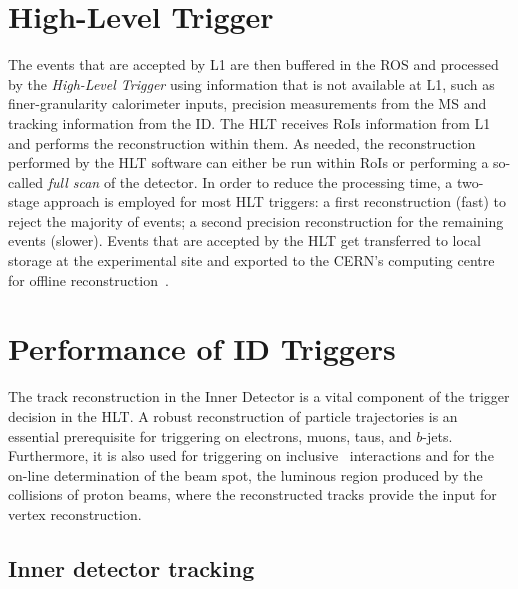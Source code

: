 
			


	\section{High-Level Trigger}
	\label{sec:HLT}

		The events that are accepted by \ac{L1} are then buffered in the \ac{ROS} and processed by the \emph{High-Level Trigger} using information that is not available at \ac{L1}, such as finer-granularity calorimeter inputs, precision measurements from the \ac{MS} and tracking information from the \ac{ID}. The \ac{HLT} receives \acp{RoI} information from \ac{L1} and performs the reconstruction within them. As needed, the reconstruction performed by the \ac{HLT} software can either be run within \ac{RoI}s or performing a so-called \emph{full scan} of the detector. In order to reduce the processing time, a two-stage approach is employed for most \ac{HLT} triggers: a first reconstruction (fast) to reject the majority of events; a second precision reconstruction for the remaining events (slower). Events that are accepted by the \ac{HLT} get transferred to local storage at the experimental site and exported to the \ac{CERN}’s computing centre for offline reconstruction~\cite{ATLASTrigger2015}. 

		\section{Performance of ID Triggers}

			The track reconstruction in the Inner Detector is a vital component of the trigger decision in the \ac{HLT}. A robust reconstruction of particle trajectories is an essential prerequisite for triggering on electrons, muons, taus, and $b$-jets. Furthermore, it is also used for triggering on inclusive \pp\ interactions and for the on-line determination of the beam spot, the luminous region produced by the collisions of proton beams, where the reconstructed tracks provide the input for vertex reconstruction.

			\subsection{Inner detector tracking}
			\label{sec:tracking}

